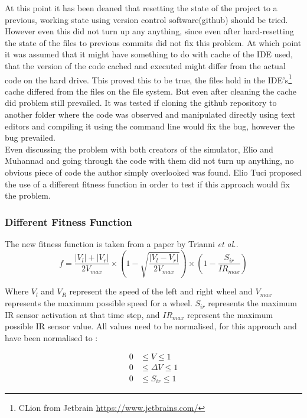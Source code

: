 At this point it has been deaned that resetting the state of the project to a previous, working state using version control software(github) should be tried.
However even this did not turn up any anything, since even after hard-resetting the state of the files to previous commits did not fix this problem.
At which point it was assumed that it might have something to do with cache of the IDE used, that the version of the code cached and executed might differ from the actual code on the hard drive. This proved this to be true, the files hold in the  IDE's\footnote{CLion from Jetbrain \url{https://www.jetbrains.com/}}  cache differed from the files on the file system.
But even after cleaning the cache did problem still prevailed. It was tested if cloning the github repository to another folder where the code was observed and manipulated directly using text editors and compiling it using the command line would fix the bug, however the bug prevailed. \\

Even discussing the problem with both creators of the simulator, Elio and Muhannad and going through the code with them did not turn up anything, no obvious piece of code the author simply overlooked was found.
Elio Tuci proposed the use of a different fitness function in order to test if this approach would fix the problem.\\

\subsubsection{Different Fitness Function}
The new fitness function is taken from a paper by Trianni \textit{et al.}\cite{Trianni}.\\

\begin{equation}
f = \frac{|V_l| + |V_r|}{2V_{max}} \times ( 1 - \sqrt{\frac{|V_l - V_r|}{2V_{max}}}) \times (1 - \frac{S_{ir}}{IR_{max}})
\end{equation}

Where $V_l$ and $V_R$ represent the speed of the left and right wheel and $V_{max}$ represents the maximum possible speed for a wheel.
$S_{ir}$ represents the maximum IR sensor activation at that time step, and $IR_{max}$ represent the maximum possible IR sensor value. 
All values need to be normalised, for this approach and have been normalised to :

\begin{align*}
	0  &\leq V \leq 1 \\  
	0  &\leq \Delta V  \leq 1 \\
	0  &\leq S_{ir} \leq 1
\end{align*}

